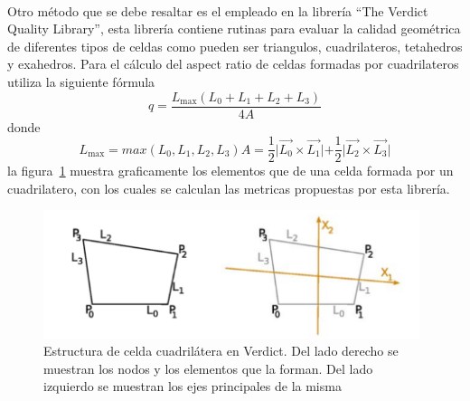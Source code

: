 \documentclass[letterpaper, openright, 12pt]{book}
\begin{document}
    \paragraph*{}
    Otro método que se debe resaltar es el empleado en la librería ``The
    Verdict Quality Library'', esta librería contiene rutinas para evaluar
    la calidad geométrica de diferentes tipos de celdas como pueden ser
    triangulos, cuadrilateros, tetahedros y exahedros. Para el cálculo del
    aspect ratio de celdas formadas por cuadrilateros utiliza la siguiente
    fórmula
    \begin{equation}
        q = \frac{L_{\max}\left( L_0 + L_1 + L_2 + L_3 \right)}{4A}
    \end{equation}
    donde
    \begin{subequations}
        \begin{equation*}
            L_{\max} = max\left( L_0, L_1, L_2, L_3 \right)
        \end{equation*}
        \begin{equation*}
            A = \frac{1}{2} \lvert \vec{L_0} \times \vec{L_1} \lvert
                + \frac{1}{2} \lvert \vec{L_2} \times \vec{L_3} \lvert
        \end{equation*}
    \end{subequations}
    la figura~\ref{aspect_verdict} muestra graficamente los elementos que
    de una celda formada por un cuadrilatero, con los cuales se calculan las
    metricas propuestas por esta librería.

        \begin{figure}[htbp!]
            \centering
            \includegraphics[keepaspectratio, width=110mm]{./Imagenes/aspect_verdict.png}
            \caption[Estrcutura celda cuadrilatera en Verdict]{Estructura de
            celda cuadrilátera en Verdict. Del lado derecho se muestran los
            nodos y los elementos que la forman. Del lado izquierdo se muestran
            los ejes principales de la misma\cite{verdict_quality}}
            \label{aspect_verdict}
        \end{figure}
\end{document}
